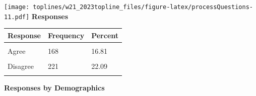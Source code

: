 \documentclass[]{article}
\begin{document}
\texttt{[image: toplines/w21\_2023topline\_files/figure-latex/processQuestions-11.pdf]}
\textbf{Responses}

\begin{tabu} to 
\toprule
Response & Frequency & Percent\\
\midrule
{} &  & \\
Agree & 168 & 16.81\\
 &  & \\
Disagree & 221 & 22.09\\
 &  & \\
\bottomrule
\end{tabu}

\textbf{Responses by Demographics}\begingroup\fontsize{7}{9}\selectfont
\end{document}
